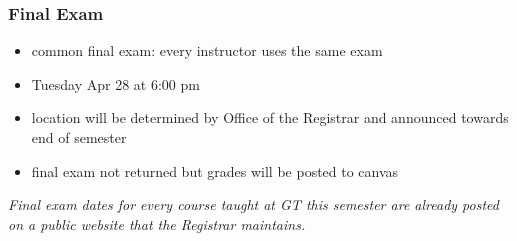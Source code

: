 \documentclass[xcolor=table,11pt,notes=hide,t,handout]{beamer}
\begin{document}
\begin{frame}\frametitle{Final Exam}

    \begin{itemize}
        \item common final exam: every instructor uses the same exam
        \item Tuesday Apr 28 at 6:00 pm
        \item location will be determined by Office of the Registrar and announced towards end of semester
        \item final exam not returned but grades will be posted to canvas
    \end{itemize}
    \textit{Final exam dates for every course taught at GT this semester are already posted on a public website that the Registrar maintains. }
\end{frame}











\end{document}
